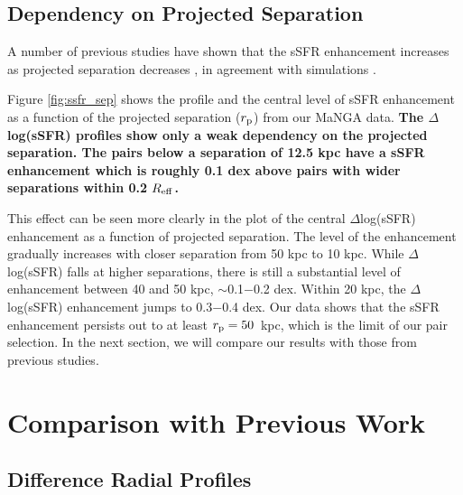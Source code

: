 \documentclass[iop,revtex4,twocolumn,apj,numberedappendix,appendixfloats]{emulateapj}
\newcommand{\reff}{$R_{\rm eff}$}
\begin{document}
\subsection{Dependency on Projected Separation}\label{sec:sep}

A number of previous studies have shown that the sSFR enhancement increases as projected separation decreases \citep[e.g.,][]{Li:2008, Ellison:2008, Scudder:2012, Patton:2013}, in agreement with simulations \citep{Scudder:2012}. 

Figure \ref{fig:ssfr_sep} shows the profile and the central level of sSFR enhancement as a function of the projected separation ($r_{\rm p}$) from our MaNGA data. \textbf{The $\Delta$log(sSFR) profiles show only a weak dependency on the projected separation. The pairs below a separation of 12.5 kpc have a sSFR enhancement which is roughly 0.1 dex above pairs with wider separations within 0.2 \reff. }


This effect can be seen more clearly in the plot of the central $\Delta$log(sSFR) enhancement as a function of projected separation. The level of the enhancement gradually increases with closer separation from 50 kpc to 10 kpc. While $\Delta$log(sSFR) falls at higher separations, there is still a substantial level of enhancement between 40 and 50 kpc, $\sim$0.1$-$0.2 dex. Within 20 kpc, the $\Delta$log(sSFR) enhancement jumps to 0.3$-$0.4 dex. Our data shows that the sSFR enhancement persists out to at least $r_{\rm p} = 50$~kpc, which is the limit of our pair selection. In the next section, we will compare our results with those from previous studies.

\section{Comparison with Previous Work}\label{sec:disc}

\subsection{Difference Radial Profiles}
\end{document}
